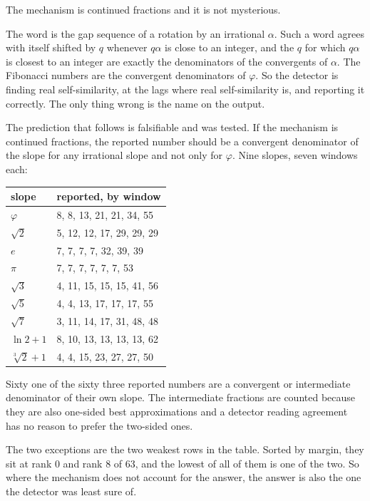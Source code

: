 The mechanism is continued fractions and it is not mysterious.

The word is the gap sequence of a rotation by an irrational \(\alpha\). Such a word agrees with
itself shifted by \(q\) whenever \(q\alpha\) is close to an integer, and the \(q\) for which
\(q\alpha\) is closest to an integer are exactly the denominators of the convergents of \(\alpha\).
The Fibonacci numbers are the convergent denominators of \(\varphi\). So the detector is finding
real self-similarity, at the lags where real self-similarity is, and reporting it correctly. The
only thing wrong is the name on the output.

The prediction that follows is falsifiable and was tested. If the mechanism is continued fractions,
the reported number should be a convergent denominator of the slope for any irrational slope and not
only for \(\varphi\). Nine slopes, seven windows each:

\begin{center}
\begin{tabular}{@{}ll@{}}
\toprule
slope & reported, by window \\
\midrule
\(\varphi\) & 8, 8, 13, 21, 21, 34, 55 \\
\(\sqrt 2\) & 5, 12, 12, 17, 29, 29, 29 \\
\(e\) & 7, 7, 7, 7, 32, 39, 39 \\
\(\pi\) & 7, 7, 7, 7, 7, 7, 53 \\
\(\sqrt 3\) & 4, 11, 15, 15, 15, 41, 56 \\
\(\sqrt 5\) & 4, 4, 13, 17, 17, 17, 55 \\
\(\sqrt 7\) & 3, 11, 14, 17, 31, 48, 48 \\
\(\ln 2 + 1\) & 8, 10, 13, 13, 13, 13, 62 \\
\(\sqrt[3]{2} + 1\) & 4, 4, 15, 23, 27, 27, 50 \\
\bottomrule
\end{tabular}
\end{center}

Sixty one of the sixty three reported numbers are a convergent or intermediate denominator of their
own slope. The intermediate fractions are counted because they are also one-sided best
approximations and a detector reading agreement has no reason to prefer the two-sided ones.

The two exceptions are the two weakest rows in the table. Sorted by margin, they sit at rank 0 and
rank 8 of 63, and the lowest of all of them is one of the two. So where the mechanism does not
account for the answer, the answer is also the one the detector was least sure of.

